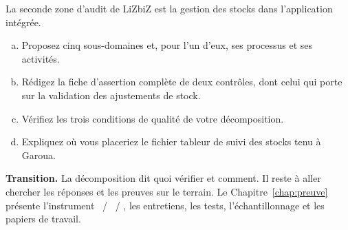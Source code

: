 \begin{boxexo}[title={\ding{45}\quad Exercice~7.3. Décomposer le domaine des stocks \niveauexpert}]
La seconde zone d'audit de LiZbiZ est la gestion des stocks dans
l'application intégrée.
\begin{enumerate}[(a)]
    \item Proposez cinq sous-domaines et, pour l'un d'eux, ses processus et
          ses activités.
    \item Rédigez la fiche d'assertion complète de deux contrôles, dont celui
          qui porte sur la validation des ajustements de stock.
    \item Vérifiez les trois conditions de qualité de votre décomposition.
    \item Expliquez où vous placeriez le fichier tableur de suivi des stocks
          tenu à Garoua.
\end{enumerate}
\end{boxexo}

\bigskip

\begin{boxinfo}
\textbf{Transition.} La décomposition dit quoi vérifier et comment. Il
reste à aller chercher les réponses et les preuves sur le terrain. Le
Chapitre~\ref{chap:preuve} présente l'instrument \OUI{}~/ \NON{}~/ \NEK{},
les entretiens, les tests, l'échantillonnage et les papiers de travail.
\end{boxinfo}
